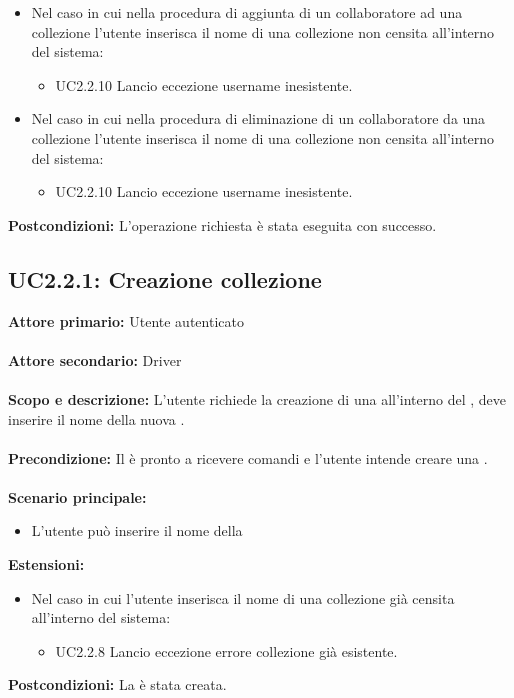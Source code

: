 \documentclass{scalatekids-article}
\begin{document}
\begin{itemize}
\item Nel caso in cui nella procedura di aggiunta di un collaboratore ad una collezione l'utente inserisca il nome di una collezione non censita all'interno del sistema:
  \begin{itemize}
    \item UC2.2.10 Lancio eccezione username inesistente.
  \end{itemize}
\item Nel caso in cui nella procedura di eliminazione di un collaboratore da una collezione l'utente inserisca il nome di una collezione non censita all'interno del sistema:
  \begin{itemize}
    \item UC2.2.10 Lancio eccezione username inesistente.
  \end{itemize}
\end{itemize}
\textbf{Postcondizioni:} L'operazione richiesta è stata eseguita con successo.

\subsection{UC2.2.1: Creazione collezione}

\textbf{Attore primario:} Utente autenticato\\ \\
\textbf{Attore secondario:} Driver\\ \\
\textbf{Scopo e descrizione:} L'utente richiede la creazione di una  all'interno del , deve inserire il nome della nuova .\\ \\
\textbf{Precondizione:} Il  è pronto a ricevere comandi e l'utente intende creare una .\\ \\
\textbf{Scenario principale:}
\begin{itemize}
\item L'utente può inserire il nome della 
\end{itemize}
\textbf{Estensioni:}
\begin{itemize}
\item Nel caso in cui l'utente inserisca il nome di una collezione già censita all'interno del sistema:
  \begin{itemize}
  \item UC2.2.8 Lancio eccezione errore collezione già esistente.
  \end{itemize}
\end{itemize}
\textbf{Postcondizioni:} La  è stata creata.
\end{document}

